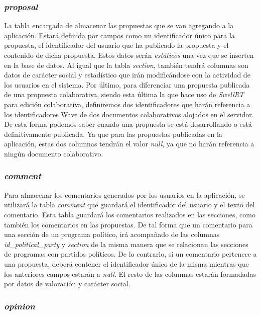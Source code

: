 \subsubsection{\textit{proposal}}

La tabla encargada de almacenar las propuestas que se van agregando a la aplicación. Estará definida por campos como un identificador único para la propuesta, el identificador del usuario que ha publicado la propuesta y el contenido de dicha propuesta. Estos datos serán \textit{estáticos} una vez que se inserten en la base de datos. Al igual que la tabla \textit{section}, también tendrá columnas son datos de carácter social y estadístico que irán modificándose con la actividad de los usuarios en el sistema. Por último, para diferenciar una propuesta publicada de una propuesta colaborativa, siendo esta última la que hace uso de \textit{SwellRT} para edición colaborativa, definiremos dos identificadores que harán referencia a los identificadores Wave de dos documentos colaborativos alojados en el servidor. De esta forma podemos saber cuando una propuesta se está desarrollando o está definitivamente publicada. Ya que para las propuestas publicadas en la aplicación, estas dos columnas tendrán el valor \textit{null}, ya que no harán referencia a ningún documento colaborativo.

\subsubsection{\textit{comment}}

Para almacenar los comentarios generados por los usuarios en la aplicación, se utilizará la tabla \textit{comment} que guardará el identificador del usuario y el texto del comentario. Esta tabla guardará los comentarios realizados en las secciones, como también los comentarios en las propuestas. De tal forma que un comentario para una sección de un programa político, irá acompañado de las columnas \textit{id\_political\_party} y \textit{section} de la misma manera que se relacionan las secciones de programas con partidos políticos. De lo contrario, si un comentario pertenece a una propuesta, deberá contener el identificador único de la misma mientras que los anteriores campos estarán a \textit{null}. El resto de las columnas estarán formadadas por datos de valoración y carácter social.

\subsubsection{\textit{opinion}}

